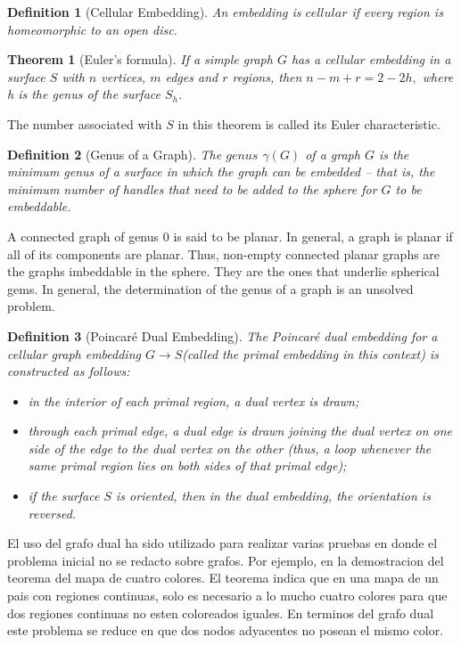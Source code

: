 \documentclass[10pt]{article}
\newtheorem{definition}{Definition}
\newtheorem{theorem}{Theorem}
\begin{document}
\begin{definition}[Cellular Embedding]
 An embedding is $cellular$ if every region is homeomorphic to an open disc.
\end{definition}

\begin{theorem}[Euler’s formula]
    If a simple graph $G$ has a cellular embedding in a surface $S$ with $n$ vertices, $m$ edges and $r$ regions, then
    $n-m+r=2-2h,$ where h is the genus of the surface $S_h$.
\end{theorem}

The number associated with $S$ in this theorem is called its Euler characteristic.

\begin{definition} [Genus of a Graph]
The $genus$ $\gamma(G)$ of a graph $G$ is the minimum genus of a surface in which the graph can be embedded – that is, the minimum number of handles that need to be added to the sphere for $G$ to be embeddable.
\end{definition}

A connected graph of genus 0 is said to be planar. In general, a graph is planar if all of its components are planar. Thus, non-empty connected planar graphs are the graphs imbeddable in the sphere. They are the ones that underlie spherical gems. In general, the determination of the genus of a graph is  an unsolved problem. 

\begin{definition}[Poincar\'e Dual Embedding]
The \emph{Poincar\'e dual embedding} for a cellular graph embedding $G\xrightarrow{}S$(called \emph{the primal embedding} in this context) is constructed as follows:
    \begin{itemize}
        \item in the interior of each primal region, a \emph{dual vertex} is drawn;
        \item through each primal edge, a \emph{dual edge} is drawn joining the dual vertex on one side of the edge to the dual vertex on the other (thus, a loop whenever the same primal region lies on both sides of that primal edge);
        \item if the surface $S$ is oriented, then in the dual embedding, the orientation is reversed.
    \end{itemize}
\end{definition}

El uso del grafo dual ha sido utilizado para realizar varias pruebas en donde el problema inicial no se redacto sobre grafos. Por ejemplo, en la demostracion del teorema del mapa de cuatro colores. El teorema indica que en una mapa de un pais con regiones continuas, solo es necesario a lo mucho cuatro colores para que dos regiones continuas no esten coloreados iguales. En terminos del grafo dual este problema se reduce en que dos nodos adyacentes no posean el mismo color.
\end{document}
